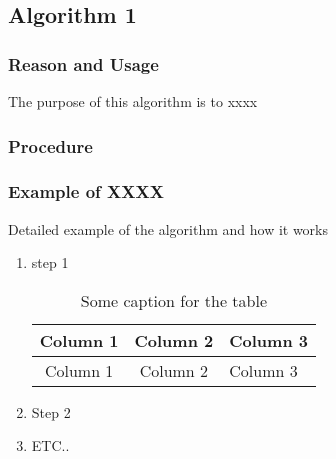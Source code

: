 \vspace{0.5cm}
\subsection{Algorithm 1}
\subsubsection{Reason and Usage}
The purpose of this algorithm is to xxxx

\subsubsection{Procedure}
\newpage
\subsubsection{Example of XXXX}
Detailed example of the algorithm and how it works 

\begin{enumerate}
    \item step 1
    \begin{table}[!h]
    \centering
    \begin{tabular}{|c|c|p{5.5cm}|}
        Column 1 & Column 2 & Column 3 \\ \hline
        Column 1 & Column 2 & Column 3 \\ \hline 
    \end{tabular} \caption{Some caption for the table} 
    \end{table}
    \item Step 2
    \item ETC..
\end{enumerate}